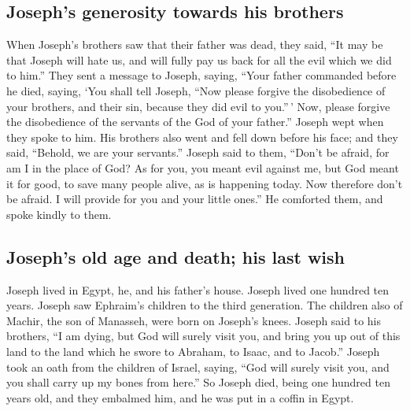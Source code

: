 \begin{paracol}{2}
\begin{otherlanguage}{english}
\hypertarget{josephs-generosity-towards-his-brothers}{%
\subsection{Joseph's generosity towards his
brothers}\label{josephs-generosity-towards-his-brothers}}

 When Joseph's brothers saw that their father was dead,
they said, ``It may be that Joseph will hate us, and will fully pay us
back for all the evil which we did to him.''  They sent a
message to Joseph, saying, ``Your father commanded before he died,
saying,  `You shall tell Joseph, ``Now please forgive the
disobedience of your brothers, and their sin, because they did evil to
you.''\,' Now, please forgive the disobedience of the servants of the
God of your father.'' Joseph wept when they spoke to him.
 His brothers also went and fell down before his face;
and they said, ``Behold, we are your servants.''  Joseph
said to them, ``Don't be afraid, for am I in the place of God?
 As for you, you meant evil against me, but God meant it
for good, to save many people alive, as is happening today.
 Now therefore don't be afraid. I will provide for you
and your little ones.'' He comforted them, and spoke kindly to them.

\hypertarget{josephs-old-age-and-death-his-last-wish}{%
\subsection{Joseph's old age and death; his last
wish}\label{josephs-old-age-and-death-his-last-wish}}

 Joseph lived in Egypt, he, and his father's house.
Joseph lived one hundred ten years.  Joseph saw Ephraim's
children to the third generation. The children also of Machir, the son
of Manasseh, were born on Joseph's knees.  Joseph said to
his brothers, ``I am dying, but God will surely visit you, and bring you
up out of this land to the land which he swore to Abraham, to Isaac, and
to Jacob.''  Joseph took an oath from the children of
Israel, saying, ``God will surely visit you, and you shall carry up my
bones from here.''  So Joseph died, being one hundred ten
years old, and they embalmed him, and he was put in a coffin in Egypt.
\end{otherlanguage} \end{paracol}
